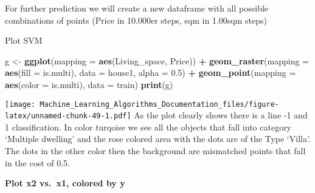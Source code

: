 \documentclass[
]{article}
\newenvironment{Shaded}{\begin{snugshade}}{\end{snugshade}}
\newcommand{\DataTypeTok}[1]{\textcolor[rgb]{0.13,0.29,0.53}{#1}}
\newcommand{\DecValTok}[1]{\textcolor[rgb]{0.00,0.00,0.81}{#1}}
\newcommand{\FloatTok}[1]{\textcolor[rgb]{0.00,0.00,0.81}{#1}}
\newcommand{\KeywordTok}[1]{\textcolor[rgb]{0.13,0.29,0.53}{\textbf{#1}}}
\newcommand{\NormalTok}[1]{#1}
\newcommand{\OperatorTok}[1]{\textcolor[rgb]{0.81,0.36,0.00}{\textbf{#1}}}
\newcommand{\StringTok}[1]{\textcolor[rgb]{0.31,0.60,0.02}{#1}}
\begin{document}
For further prediction we will create a new dataframe with all possible
combinations of points (Price in 10.000er steps, sqm in 1.00sqm steps)

\begin{Shaded}
\end{Shaded}

Plot SVM

\begin{Shaded}
\begin{Highlighting}[]
\NormalTok{g <-}\StringTok{ }\KeywordTok{ggplot}\NormalTok{(}\DataTypeTok{mapping =} \KeywordTok{aes}\NormalTok{(Living_space, Price)) }\OperatorTok{+}
\StringTok{  }\KeywordTok{geom_raster}\NormalTok{(}\DataTypeTok{mapping =} \KeywordTok{aes}\NormalTok{(}\DataTypeTok{fill =}\NormalTok{ is.multi), }\DataTypeTok{data =}\NormalTok{ house1, }\DataTypeTok{alpha =} \FloatTok{0.5}\NormalTok{) }\OperatorTok{+}
\StringTok{  }\KeywordTok{geom_point}\NormalTok{(}\DataTypeTok{mapping =} \KeywordTok{aes}\NormalTok{(}\DataTypeTok{color =}\NormalTok{ is.multi), }\DataTypeTok{data =}\NormalTok{ train)}
\KeywordTok{print}\NormalTok{(g)}
\end{Highlighting}
\end{Shaded}

\texttt{[image: Machine\_Learning\_Algorithms\_Documentation\_files/figure-latex/unnamed-chunk-49-1.pdf]}
As the plot clearly shows there is a line -1 and 1 classification. In
color turqoise we see all the objects that fall into category `Multiple
dwelling' and the rose colored area with the dots are of the Type
`Villa'. The dots in the other color then the background are mismatched
points that fall in the cost of 0.5.

\textbf{Plot x2 vs.~x1, colored by y}
\end{document}
